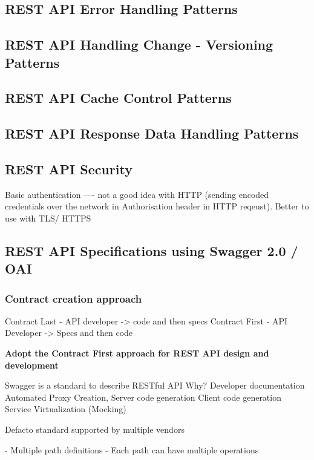 \subsection{REST API Error Handling Patterns}

\subsection{REST API Handling Change - Versioning Patterns}

\subsection{REST API Cache Control Patterns}

\subsection{REST API Response Data Handling Patterns}

\subsection{REST API Security}

Basic authentication ---- not a good idea with HTTP (sending encoded credentials over the network in Authorisation header in HTTP reqeust). Better to use with TLS/ HTTPS

\subsection{REST API Specifications using Swagger 2.0 / OAI}

\subsubsection{Contract creation approach}
Contract Last - API developer -> code and then specs
Contract First - API Developer -> Specs and then code

\textbf{Adopt the Contract First approach for REST API design and development}

Swagger is a standard to describe RESTful API
Why?
Developer documentation
Automated Proxy Creation, Server code generation
Client code generation
Service Virtualization (Mocking)

Defacto standard supported by multiple vendors

- Multiple path definitions
- Each path can have multiple operations

